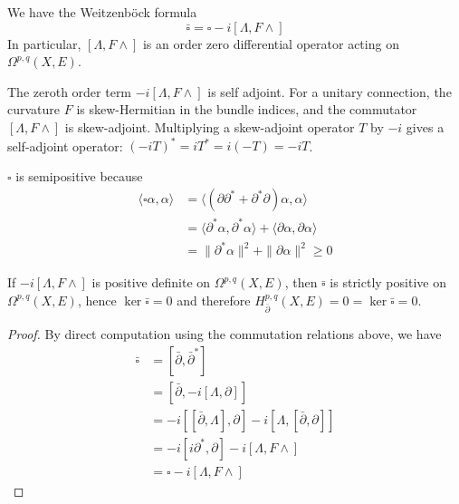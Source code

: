 \documentclass[12pt]{article}
\begin{document}
\begin{theorem}
     We have the Weitzenböck formula
    \[
    \bar\square = \square - i[\Lambda,F\wedge ]
    \]
    In particular, $[\Lambda,F\wedge]$ is an order zero differential operator acting on $\Omega^{p,q}(X,E)$.
\end{theorem}



\begin{remark}
    The zeroth order term $-i[\Lambda,F\wedge]$ is self adjoint. For a unitary connection, the curvature $F$ is skew-Hermitian in the
bundle indices, and the commutator $[\Lambda,F\wedge]$ is skew-adjoint. Multiplying a skew-adjoint operator $T$ by $-i$ gives a
self-adjoint operator: $(-iT)^* = iT^* = i(-T) = -iT$.
\end{remark}

\begin{remark}
    $\square$ is semipositive because \begin{align*}
    \langle \square \alpha, \alpha \rangle
    &= \langle (\partial\partial^* + \partial^*\partial)\alpha, \alpha \rangle \\
    &= \langle \partial^*\alpha, \partial^*\alpha \rangle + \langle \partial\alpha, \partial\alpha \rangle \\
    &= \|\partial^*\alpha\|^2 + \|\partial\alpha\|^2 \geq 0
    \end{align*}
\end{remark}

\begin{remark}
    If $-i[\Lambda,F\wedge]$ is positive definite on $\Omega^{p,q}(X,E)$, then $\bar\square$ is strictly positive on $\Omega^{p,q}(X,E)$, hence $\ker\bar\square=0$ and therefore $H^{p,q}_{\bar\partial}(X,E)=0 = \ker\bar\square = 0$.
\end{remark}

\begin{proof}
    By direct computation using the commutation relations above, we have
    \begin{align*}
    \bar\square
    &= [\bar{\partial}, \bar{\partial}^*] \\
    &= [\bar{\partial}, -i[\Lambda,\partial]] \\
    &= -i[[\bar\partial, \Lambda], \partial] - i[\Lambda, [\bar\partial, \partial]] \\
    &= -i[i\partial^*, \partial] - i[\Lambda, F\wedge] \\
    &= \square - i[\Lambda, F\wedge] 
    \end{align*}
\end{proof}
\end{document}
